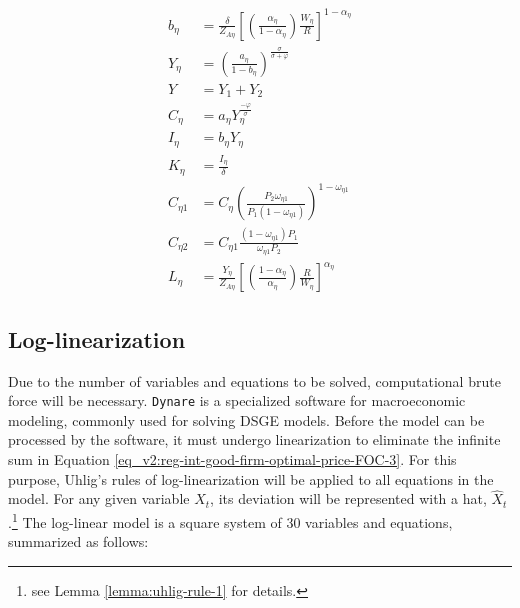 \documentclass[../thesis.tex]{subfiles}
\begin{document}
\begin{align}
	\\
	b_{\eta} &= \frac{\delta}{Z_{A\eta}} \left[ \left( \frac{{\alpha_{\eta}}}{1-\alpha_{\eta}} \right) \frac{W_{\eta}}{R} \right]^{1 - \alpha_{\eta}} \label{eq_v2:reg-ss-b-eta}
	\\
	Y_{\eta} &= \left( \frac{a_{\eta}}{1 - b_{\eta}} \right)^{\frac{\sigma}{\sigma + \varphi}} \label{eq_v2:reg-ss-yn}
	\\
	Y_{} &= Y_{1} + Y_{2} \label{eq_v2:reg-ss-market-clearing-condition-Yt} 
	\\
	C_{\eta} &= a_{\eta} Y_{\eta}^{\frac{-\varphi}{\sigma}} \label{eq_v2:reg-ss-consumption}
	\\
	I_{\eta} &= b_{\eta} Y_{\eta} \label{eq_v2:reg-ss-law-of-motion-of-capital-2}
	\\
	K_{\eta} &= \frac{I_{\eta}}{\delta} \label{eq_v2:reg-ss-law-of-motion-of-capital}
	\\
	C_{\eta 1} &= C_{\eta} \left( \frac{P_{2} \omega_{\eta 1}}{P_{1} (1 - \omega_{\eta 1})} \right)^{1-\omega_{\eta 1}} \label{eq_v2:reg-ss-C-eta-1-t} 
	\\
	C_{\eta 2} &= C_{\eta 1} \frac{(1 - \omega_{\eta 1}) P_{1}}{\omega_{\eta 1} P_{2}} \label{eq_v2:reg-ss-C-eta-12-t} 
	\\
	L_{\eta} &= \frac{Y_{\eta}}{Z_{A\eta}} \left[ \left( \frac{1-\alpha_{\eta}}{{\alpha_{\eta}}} \right) \frac{R}{W_{\eta}} \right]^{\alpha_{\eta}} \label{eq_v2:reg-ss-int-good-firm-production-function-3}
\end{align}

	
	
\subsection{Log-linearization}
	
Due to the number of variables and equations to be solved, computational brute force will be necessary. \texttt{Dynare} is a specialized software for macroeconomic modeling, commonly used for solving DSGE models. Before the model can be processed by the software, it must undergo linearization to eliminate the infinite sum in Equation \ref{eq_v2:reg-int-good-firm-optimal-price-FOC-3}. For this purpose, Uhlig's rules of log-linearization \cite{uhlig_toolkit_1999} will be applied to all equations in the model. For any given variable $X_{t}$, its deviation will be represented with a hat, $\hat{X}_{t}$.\footnote{see Lemma \ref{lemma:uhlig-rule-1} for details.} The log-linear model is a square system of 30 variables and equations, summarized as follows:
\end{document}
